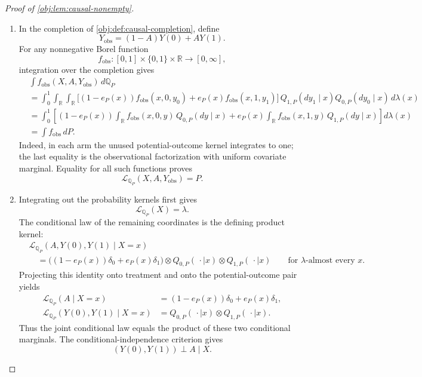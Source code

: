 \begin{proof}[Proof of \cref{obj:lem:causal-nonempty}]
\begin{enumerate}
\item In the completion of \cref{obj:def:causal-completion}, define
\[
Y_{\mathrm{obs}}=(1-A)Y(0)+AY(1).
\]
For any nonnegative Borel function
\[
f_{\mathrm{obs}}:[0,1]\times\{0,1\}\times\mathbb R
\longrightarrow[0,\infty],
\]
integration over the completion gives
\[
\begin{aligned}
&\int f_{\mathrm{obs}}(X,A,Y_{\mathrm{obs}})\,d\mathbb Q_P\\
&=\int_0^1
 \int_{\mathbb R}\int_{\mathbb R}
 \bigl[
 (1-e_P(x))f_{\mathrm{obs}}(x,0,y_0)
 +e_P(x)f_{\mathrm{obs}}(x,1,y_1)
 \bigr]\,
 Q_{1,P}(dy_1\mid x)Q_{0,P}(dy_0\mid x)\,d\lambda(x)\\
&=\int_0^1\left[
 (1-e_P(x))\int_{\mathbb R}f_{\mathrm{obs}}(x,0,y)\,Q_{0,P}(dy\mid x)
 +e_P(x)\int_{\mathbb R}f_{\mathrm{obs}}(x,1,y)\,Q_{1,P}(dy\mid x)
 \right]d\lambda(x)\\
&=\int f_{\mathrm{obs}}\,dP.
\end{aligned}
\]
Indeed, in each arm the unused potential-outcome kernel integrates to one; the last equality is the observational factorization with uniform covariate marginal. Equality for all such functions proves
\[
\mathcal L_{\mathbb Q_P}(X,A,Y_{\mathrm{obs}})=P.
\]

\item\label{proof:causal-nonempty:conditional-law} Integrating out the probability kernels first gives
\[
\mathcal L_{\mathbb Q_P}(X)=\lambda.
\]
The conditional law of the remaining coordinates is the defining product kernel:
\[
\begin{aligned}
&\mathcal L_{\mathbb Q_P}(A,Y(0),Y(1)\mid X=x)\\
&\quad=
\bigl((1-e_P(x))\delta_0+e_P(x)\delta_1\bigr)
\otimes Q_{0,P}(\,\cdot\mid x)
\otimes Q_{1,P}(\,\cdot\mid x)
\qquad\text{for \(\lambda\)-almost every }x.
\end{aligned}
\]
Projecting this identity onto treatment and onto the potential-outcome pair yields
\[
\begin{aligned}
\mathcal L_{\mathbb Q_P}(A\mid X=x)
&=(1-e_P(x))\delta_0+e_P(x)\delta_1,\\
\mathcal L_{\mathbb Q_P}(Y(0),Y(1)\mid X=x)
&=Q_{0,P}(\,\cdot\mid x)\otimes Q_{1,P}(\,\cdot\mid x).
\end{aligned}
\]
Thus the joint conditional law equals the product of these two conditional marginals. The conditional-independence criterion gives
\[
(Y(0),Y(1))\perp A\mid X.
\]


\end{enumerate}
\end{proof}
